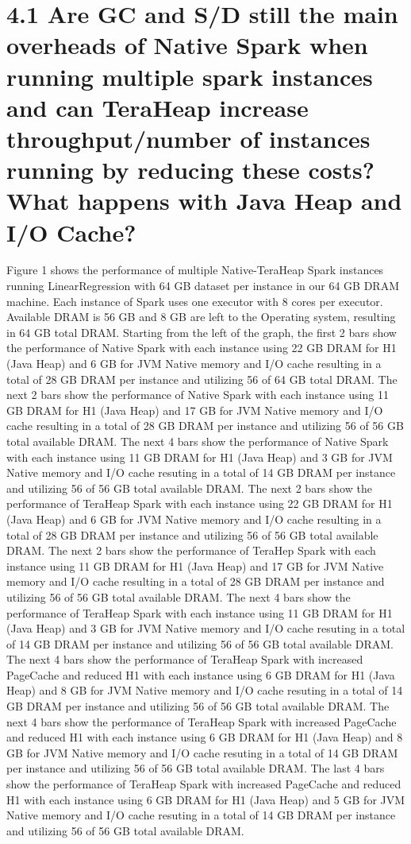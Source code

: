 \documentclass[twocolumn,10pt]{asme2e}
\begin{document}
\section*{4.1 Are GC and S/D still the main overheads of Native Spark when running multiple spark instances and can TeraHeap increase throughput/number of instances running by reducing these costs? What happens with Java Heap and I/O Cache?}

Figure 1 shows the performance of multiple Native-TeraHeap Spark instances running LinearRegression with 64 GB dataset per instance in our 64 GB DRAM machine. Each instance of Spark uses one executor with 8 cores per executor. Available DRAM is 56 GB and 8 GB are left to the Operating system, resulting in 64 GB total DRAM. Starting from the left of the graph, the first 2 bars show the performance of Native Spark with each instance using 22 GB DRAM for H1 (Java Heap) and 6 GB for JVM Native memory and I/O cache resulting in a total of 28 GB DRAM per instance and utilizing 56 of 64 GB total DRAM. The next 2 bars show the performance of Native Spark with each instance using 11 GB DRAM for H1 (Java Heap) and 17 GB for JVM Native memory and I/O cache resulting in a total of 28 GB DRAM per instance and utilizing 56 of 56 GB total available DRAM. The next 4 bars show the performance of Native Spark with each instance using 11 GB DRAM for H1 (Java Heap) and 3 GB for JVM Native memory and I/O cache resuting in a total of 14 GB DRAM per instance and utilizing 56 of 56 GB total available DRAM. 
The next 2 bars show the performance of TeraHeap Spark with each instance using 22 GB DRAM for H1 (Java Heap) and 6 GB for JVM Native memory and I/O cache resulting in a total of 28 GB DRAM per instance and utilizing 56 of 56 GB total available DRAM. The next 2 bars show the performance of TeraHep Spark with each instance using 11 GB DRAM for H1 (Java Heap) and 17 GB for JVM Native memory and I/O cache resulting in a total of 28 GB DRAM per instance and utilizing 56 of 56 GB total available DRAM. The next 4 bars show the performance of TeraHeap Spark with each instance using 11 GB DRAM for H1 (Java Heap) and 3 GB for JVM Native memory and I/O cache resuting in a total of 14 GB DRAM per instance and utilizing 56 of 56 GB total available DRAM. The next 4 bars show the performance of TeraHeap Spark with increased PageCache and reduced H1 with each instance using 6 GB DRAM for H1 (Java Heap) and 8 GB for JVM Native memory and I/O cache resuting in a total of 14 GB DRAM per instance and utilizing 56 of 56 GB total available DRAM. The next 4 bars show the performance of TeraHeap Spark with increased PageCache and reduced H1 with each instance using 6 GB DRAM for H1 (Java Heap) and 8 GB for JVM Native memory and I/O cache resuting in a total of 14 GB DRAM per instance and utilizing 56 of 56 GB total available DRAM. The last 4 bars show the performance of TeraHeap Spark with increased PageCache and reduced H1 with each instance using 6 GB DRAM for H1 (Java Heap) and 5 GB for JVM Native memory and I/O cache resuting in a total of 14 GB DRAM per instance and utilizing 56 of 56 GB total available DRAM.
\end{document}
